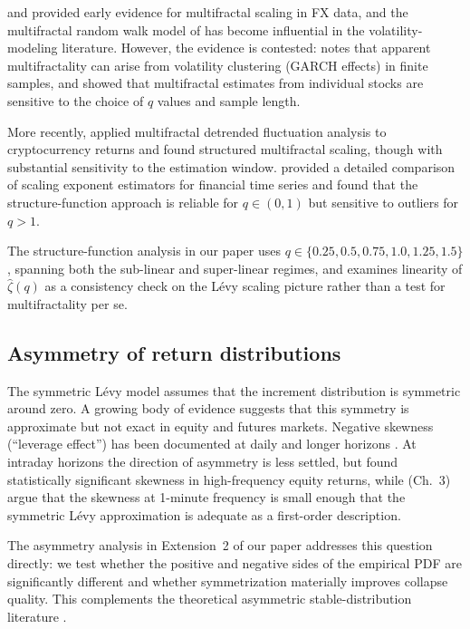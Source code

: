 \documentclass[12pt,a4paper]{article}
\begin{document}
\textcite{Calvet1997} and \textcite{Mandelbrot1997} provided early evidence
for multifractal scaling in FX data, and the multifractal random walk model of
\textcite{BacryMuzy2003} has become influential in the volatility-modeling
literature. However, the evidence is contested: \textcite{Cont2001} notes that
apparent multifractality can arise from volatility clustering (GARCH effects)
in finite samples, and \textcite{Eisler2004} showed that multifractal estimates
from individual stocks are sensitive to the choice of $q$ values and sample length.

More recently, \textcite{Saadaoui2024} applied multifractal detrended
fluctuation analysis to cryptocurrency returns and found structured multifractal
scaling, though with substantial sensitivity to the estimation window.
\textcite{Morales2012} provided a detailed comparison of scaling exponent
estimators for financial time series and found that the structure-function
approach is reliable for $q \in (0,1)$ but sensitive to outliers for $q > 1$.

The structure-function analysis in our paper uses $q \in \{0.25, 0.5, 0.75,
1.0, 1.25, 1.5\}$, spanning both the sub-linear and super-linear regimes, and
examines linearity of $\hat\zeta(q)$ as a consistency check on the Lévy
scaling picture rather than a test for multifractality per se.

\subsection{Asymmetry of return distributions}

The symmetric Lévy model assumes that the increment distribution is symmetric
around zero. A growing body of evidence suggests that this symmetry is
approximate but not exact in equity and futures markets. Negative skewness
(``leverage effect'') has been documented at daily and longer horizons
\parencite{Cont2001,Bouchaud2001}. At intraday horizons the direction of
asymmetry is less settled, but \textcite{Ait-Sahalia2002} found statistically
significant skewness in high-frequency equity returns, while
\textcite{BouchaudPotters2003} (Ch.~3) argue that the skewness at 1-minute
frequency is small enough that the symmetric Lévy approximation is adequate as
a first-order description.

The asymmetry analysis in Extension~2 of our paper addresses this question
directly: we test whether the positive and negative sides of the empirical PDF
are significantly different and whether symmetrization materially improves
collapse quality. This complements the theoretical asymmetric stable-distribution
literature \parencite{Zolotarev1986,Nolan2001}.
\end{document}

